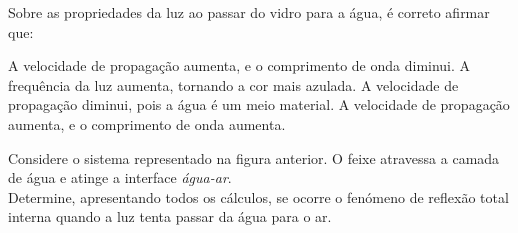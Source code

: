 \documentclass[addpoints,answers]{exam}
\begin{document}
\begin{questions}
{\begin{minipage}{0.6\textwidth}
			\end{minipage}
		}
		
		\vspace{15pt}
		\question[8] Sobre as propriedades da luz ao passar do vidro para a água, é correto afirmar que:
		
		\begin{randomizechoices}
			\choice A velocidade de propagação aumenta, e o comprimento de onda diminui.
			\choice A frequência da luz aumenta, tornando a cor mais azulada.
			\choice A velocidade de propagação diminui, pois a água é um meio material.
			\correctchoice A velocidade de propagação aumenta, e o comprimento de onda aumenta.
		\end{randomizechoices}
		
		\vspace{15pt}
		\question[12] Considere o sistema representado na figura anterior. O feixe atravessa a camada de água e atinge a interface \textit{água-ar}.\\
		Determine, apresentando todos os cálculos, se ocorre o fenómeno de reflexão total interna quando a luz tenta passar da água para o ar.


\end{questions}
\end{document}
